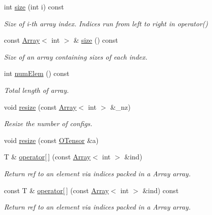 \begin{DoxyCompactItemize}
int \mbox{\hyperlink{classENSEM_1_1OTensor_aeb39779caeadcbcea94d9ef629913287}{size}} (int i) const
\begin{DoxyCompactList}\small\item\em Size of i-\/th array index. Indices run from left to right in operator() \end{DoxyCompactList}\item 
const \mbox{\hyperlink{classXMLArray_1_1Array}{Array}}$<$ int $>$ \& \mbox{\hyperlink{classENSEM_1_1OTensor_aa34f5311f161a9b4aef0b08af6fb8d34}{size}} () const
\begin{DoxyCompactList}\small\item\em Size of an array containing sizes of each index. \end{DoxyCompactList}\item 
int \mbox{\hyperlink{classENSEM_1_1OTensor_a30a241a5b4f16fab55fd70ffee52828a}{num\+Elem}} () const
\begin{DoxyCompactList}\small\item\em Total length of array. \end{DoxyCompactList}\item 
void \mbox{\hyperlink{classENSEM_1_1OTensor_abe0bd734d08b1140d7794ec760a89435}{resize}} (const \mbox{\hyperlink{classXMLArray_1_1Array}{Array}}$<$ int $>$ \&\+\_\+nz)
\begin{DoxyCompactList}\small\item\em Resize the number of configs. \end{DoxyCompactList}\item 
void \mbox{\hyperlink{classENSEM_1_1OTensor_aee9b85f3726c01139b9194a3b95809d3}{resize}} (const \mbox{\hyperlink{classENSEM_1_1OTensor}{O\+Tensor}} \&a)
\item 
T \& \mbox{\hyperlink{classENSEM_1_1OTensor_adbfded2bb2af9d68e0a040df0d19b2d6}{operator\mbox{[}$\,$\mbox{]}}} (const \mbox{\hyperlink{classXMLArray_1_1Array}{Array}}$<$ int $>$ \&ind)
\begin{DoxyCompactList}\small\item\em Return ref to an element via indices packed in a Array array. \end{DoxyCompactList}\item 
const T \& \mbox{\hyperlink{classENSEM_1_1OTensor_aa649ae52fc364d173eb02db2fbee8172}{operator\mbox{[}$\,$\mbox{]}}} (const \mbox{\hyperlink{classXMLArray_1_1Array}{Array}}$<$ int $>$ \&ind) const
\begin{DoxyCompactList}\small\item\em Return ref to an element via indices packed in a Array array. \end{DoxyCompactList}\item 

\end{DoxyCompactItemize}
